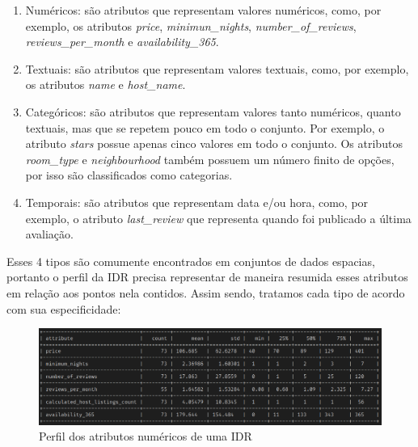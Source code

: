 \begin{enumerate}
	\item Numéricos: são atributos que representam valores numéricos, como, por exemplo, os atributos {\em price}, {\em minimun\_nights}, {\em number\_of\_reviews}, {\em reviews\_per\_month} e {\em availability\_365}.
	\item Textuais: são atributos que representam valores textuais, como, por exemplo, os atributos {\em name} e {\em host\_name}.
	\item Categóricos: são atributos que representam valores tanto numéricos, quanto textuais, mas que se repetem pouco em todo o conjunto. Por exemplo, o atributo {\em stars} possue apenas cinco valores em todo o conjunto. Os atributos {\em room\_type} e {\em neighbourhood} também possuem um número finito de opções, por isso são classificados como categorias.
	\item Temporais: são atributos que representam data e/ou hora, como, por exemplo, o atributo {\em last\_review} que representa quando foi publicado a última avaliação.
\end{enumerate}

Esses 4 tipos são comumente encontrados em conjuntos de dados espacias, portanto o perfil da IDR precisa representar de maneira resumida esses atributos em relação aos pontos nela contidos. Assim sendo, tratamos cada tipo de acordo com sua especificidade:

\begin{figure}[t]
	\centering
	\includegraphics[width=\columnwidth]{imagens/perfil-numericos}
	\caption{Perfil dos atributos numéricos de uma IDR}
	\label{fig:perfil-numericos}
	\vspace{-10pt}
\end{figure}


